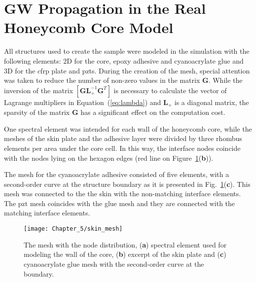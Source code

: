 \section{GW Propagation in the Real Honeycomb Core Model}
\label{sec:honeycomb}

All structures used to create the sample were modeled in the simulation with the following elements: 2D for the core, epoxy adhesive and cyanoacrylate glue and 3D for the \ac{cfrp} plate and \acp{pzt}.
During the creation of the mesh, special attention was taken to reduce the number of non-zero values in the matrix \(\textbf{G}\). While the inversion of the matrix \(\left [\textbf{GL}_+^{-1}\textbf{G}^T\right ]\) is necessary to calculate the vector of Lagrange multipliers in \mbox{Equation~(\ref{eq:lambda})} and \(\textbf{L}_+\) is a diagonal matrix, the sparsity of the matrix \(\textbf{G}\) has a significant effect on the computation cost.

One spectral element was intended for each wall of the honeycomb core, while the meshes of the skin plate and the adhesive layer were divided by three rhombus elements per area under the core cell.
In this way, the interface nodes coincide with the nodes lying on the hexagon edges (red line on Figure~\ref{fig:skin_mesh}(\textbf{b})).

The mesh for the cyanoacrylate adhesive consisted of five elements, with a second-order curve at the structure boundary as it is presented in Fig.~\ref{fig:skin_mesh}(\textbf{c}).
This mesh was connected to the the skin with the non-matching interface elements.
The \ac{pzt} mesh coincides with the glue mesh and they are connected with the matching interface elements.
\begin{figure}[H]
	\begin{center}
		\texttt{[image: Chapter\_5/skin\_mesh]}
	\end{center}
	\caption{The mesh with the node distribution, (\textbf{a}) spectral element used for modeling the wall of the core, (\textbf{b}) excerpt of the skin plate and (\textbf{c}) cyanoacrylate glue mesh with the second-order curve at the boundary.}
	\label{fig:skin_mesh}
\end{figure}


